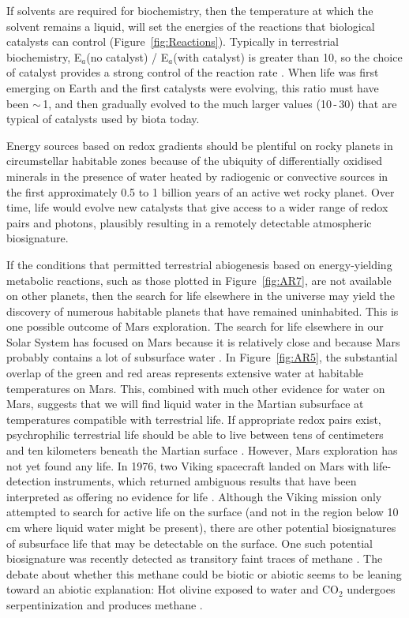 If solvents are required for biochemistry, then the temperature at which the solvent remains a liquid, will set the energies of the reactions that biological catalysts can control (Figure~\ref{fig:Reactions}). Typically in terrestrial biochemistry, E$_{a}$(no catalyst) / E$_{a}$(with catalyst) is greater than 10, so the choice of catalyst provides a strong control of the reaction rate \citep{Quinn2014,Alberty2005}. When life was first emerging on Earth and the first catalysts were evolving, this ratio must have been $\sim$\,1, and then gradually evolved to the much larger values (10\,-\,30) that are typical of catalysts used by biota today. 

Energy sources based on redox gradients should be plentiful on rocky planets in circumstellar habitable zones because of the ubiquity of differentially oxidised minerals in the presence of water heated by radiogenic or convective sources in the first approximately 0.5 to 1 billion years of an active wet rocky planet. Over time, life would evolve new catalysts that give access to a wider range of redox pairs and photons, plausibly resulting in a remotely detectable atmospheric biosignature.

If the conditions that permitted terrestrial abiogenesis based on energy-yielding metabolic reactions, such as those plotted in Figure~\ref{fig:AR7}, are not available on other planets, then the search for life elsewhere in the universe may yield the discovery of numerous habitable planets that have remained uninhabited. This is one possible outcome of Mars exploration. The search for life elsewhere in our Solar System has focused on Mars because it is relatively close and because Mars probably contains a lot of subsurface water \citep{Jones2011,Michalski2013}. In Figure~\ref{fig:AR5}, the substantial overlap of the green and red areas represents extensive water at habitable temperatures on Mars. This, combined with much other evidence for water on Mars, suggests that we will find liquid water in the Martian subsurface at temperatures compatible with terrestrial life. If appropriate redox pairs exist, psychrophilic terrestrial life should be able to live between tens of centimeters and ten kilometers beneath the Martian surface \citep{Jones2011}. However, Mars exploration has not yet found any life. In 1976, two Viking spacecraft landed on Mars with life-detection instruments, which returned ambiguous results that have been interpreted as offering no evidence for life \citep{Klein1979,Klein1999,Navarro-Gonzalez2010} \citep[see, however,][]{Levin1981}. Although the Viking mission only attempted to search for active life on the surface (and not in the region below 10 cm where liquid water might be present), there are other potential biosignatures of subsurface life that may be detectable on the surface. One such potential biosignature was recently detected as transitory faint traces of methane \citep{Formisano2004,Krasnopolsky2004,Mumma2009,Lefevre2009}. The debate about whether this methane could be biotic or abiotic seems to be leaning toward an abiotic explanation: Hot olivine exposed to water and CO$_{2}$ undergoes serpentinization and produces methane \citep{Kasting2012,Webster2011}.

